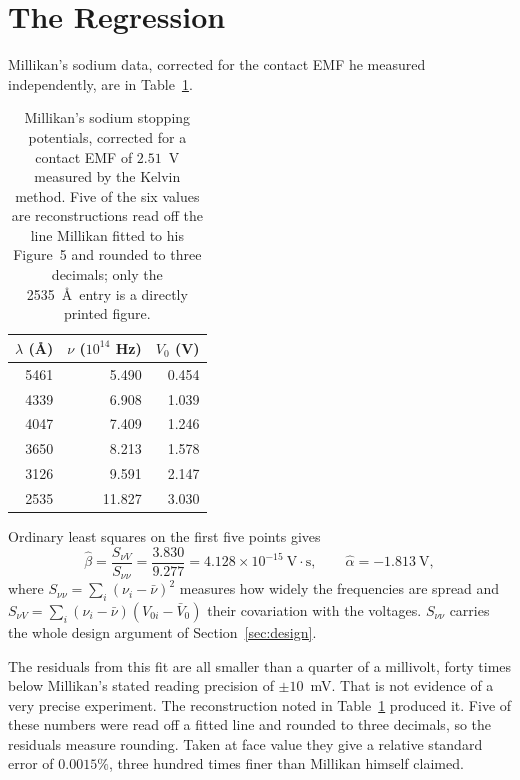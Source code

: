 \documentclass[11pt]{article}
\begin{document}
\section{The Regression}

Millikan's sodium data, corrected for the contact EMF he measured
independently, are in Table~\ref{tab:data}.

\begin{table}[ht]
\centering
\caption{Millikan's sodium stopping potentials, corrected for a contact EMF
of $2.51$~V measured by the Kelvin method.  Five of the six values are
reconstructions read off the line Millikan fitted to his Figure~5 and rounded
to three decimals; only the 2535~\AA\ entry is a directly printed figure.}
\label{tab:data}
\medskip
\begin{tabular}{rrr}
\toprule
$\lambda$ (\AA) & $\nu$ ($10^{14}$ Hz) & $V_0$ (V) \\
\midrule
5461 &  5.490 & 0.454 \\
4339 &  6.908 & 1.039 \\
4047 &  7.409 & 1.246 \\
3650 &  8.213 & 1.578 \\
3126 &  9.591 & 2.147 \\
2535 & 11.827 & 3.030 \\
\bottomrule
\end{tabular}
\end{table}

Ordinary least squares on the first five points gives
\begin{equation}\label{eq:fit}
  \hat\beta = \frac{S_{\nu V}}{S_{\nu\nu}} = \frac{3.830}{9.277}
    = 4.128\times10^{-15}~\text{V}\cdot\text{s},
  \qquad \hat\alpha = -1.813~\text{V},
\end{equation}
where $S_{\nu\nu} = \sum_i (\nu_i - \bar\nu)^2$ measures how widely the
frequencies are spread and $S_{\nu V} = \sum_i (\nu_i - \bar\nu)(V_{0i} -
\bar V_0)$ their covariation with the voltages.  $S_{\nu\nu}$ carries the whole
design argument of Section~\ref{sec:design}.

The residuals from this fit are all smaller than a quarter of a millivolt,
forty times below Millikan's stated reading precision of $\pm10$~mV.  That is
not evidence of a very precise experiment.  The reconstruction noted in
Table~\ref{tab:data} produced it.  Five of these numbers were read off a
fitted line and rounded to three decimals, so the residuals measure
rounding.  Taken at face value they give a
relative standard error of $0.0015\%$, three hundred times finer than Millikan
himself claimed.
\end{document}
